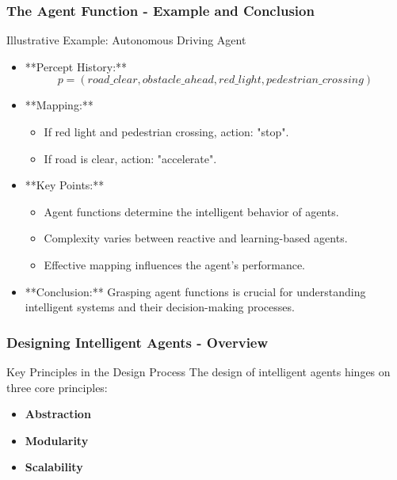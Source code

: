 \documentclass[aspectratio=169]{beamer}
\begin{document}
\begin{frame}[fragile]
    \frametitle{The Agent Function - Example and Conclusion}
    \begin{block}{Illustrative Example: Autonomous Driving Agent}
        \begin{itemize}
            \item **Percept History:** 
            \[
            p = (road\_clear, obstacle\_ahead, red\_light, pedestrian\_crossing)
            \]
            \item **Mapping:**
                \begin{itemize}
                    \item If red light and pedestrian crossing, action: "stop".
                    \item If road is clear, action: "accelerate".
                \end{itemize}
        \end{itemize}
    \end{block}
    \begin{itemize}
        \item **Key Points:**
            \begin{itemize}
                \item Agent functions determine the intelligent behavior of agents.
                \item Complexity varies between reactive and learning-based agents.
                \item Effective mapping influences the agent's performance.
            \end{itemize}
        \item **Conclusion:** Grasping agent functions is crucial for understanding intelligent systems and their decision-making processes.
    \end{itemize}
\end{frame}

\begin{frame}[fragile]
    \frametitle{Designing Intelligent Agents - Overview}
    \begin{block}{Key Principles in the Design Process}
        The design of intelligent agents hinges on three core principles:
        \begin{itemize}
            \item \textbf{Abstraction}
            \item \textbf{Modularity}
            \item \textbf{Scalability}
        \end{itemize}
    \end{block}
\end{frame}
\end{document}
